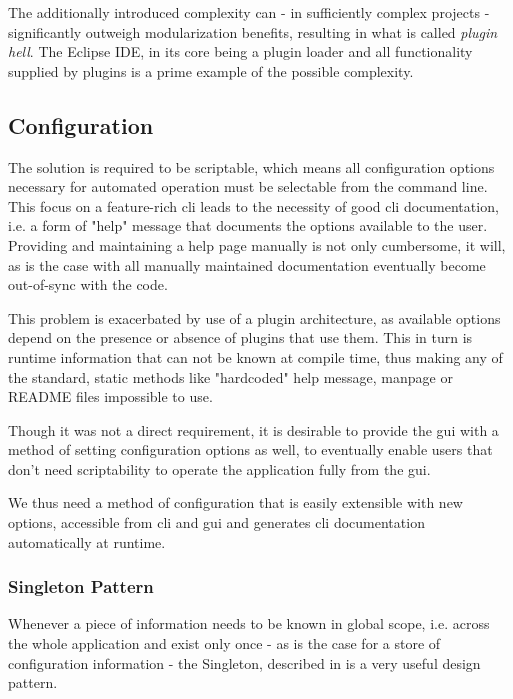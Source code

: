 The additionally introduced complexity can - in sufficiently complex projects - significantly outweigh modularization benefits, resulting in what is called \textit{plugin hell}.
The Eclipse IDE, in its core being a plugin loader and all functionality supplied by plugins is a prime example of the possible complexity.



\subsection{Configuration}
The solution is required to be scriptable, which means all configuration options necessary for automated operation must be selectable from the command line.
This focus on a feature-rich \gls{cli} leads to the necessity of good \gls{cli} documentation, i.e. a form of "help" message that documents the options available to the user.
Providing and maintaining a help page manually is not only cumbersome, it will, as is the case with all manually maintained documentation eventually become out-of-sync with the code.

This problem is exacerbated by use of a plugin architecture, as available options depend on the presence or absence of plugins that use them. This in turn is runtime information that can not be known at compile time, thus making any of the standard, static methods like "hardcoded" help message, manpage or README files impossible to use.

Though it was not a direct requirement, it is desirable to provide the \gls{gui} with a method of setting configuration options as well, to eventually enable users that don't need scriptability to operate the application fully from the \gls{gui}.

We thus need a method of configuration that is easily extensible with new options, accessible from \gls{cli} and \gls{gui} and generates \gls{cli} documentation automatically at runtime.

\subsubsection{Singleton Pattern}
\label{sec:ston}
Whenever a piece of information needs to be known in global scope, i.e. across the whole application and exist only once - as is the case for a store of configuration information - the Singleton, described in \citet[pp. 127ff]{Gamma1994} is a very useful design pattern. 

